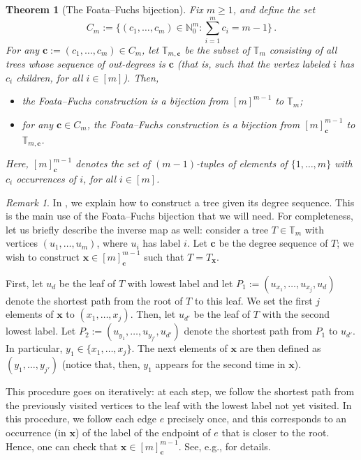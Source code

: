 \documentclass{article}
\newtheorem{theorem}{Theorem}[section]
\theoremstyle{remark}
\newtheorem{remark}{Remark}
\newcommand{\bN}{\mathbb{N}}
\newcommand{\bx}{\textbf{x}}
\newcommand{\bT}{\mathbb{T}}
\newcommand{\bc}{\mathbf{c}}
\begin{document}
\begin{theorem}[The Foata--Fuchs bijection]
\label{thm:foata fuchs}
Fix $m \geq 1$, and define the set 
\[
    C_m:= \Big\{ (c_1,\ldots,c_m) \in \bN_0^m : \sum_{i=1}^m c_i=m-1 \Big\} \,.
\] 
For any $\bc := (c_1,\ldots,c_m) \in C_m$, let $\bT_{m,\bc}$ be the subset of $\bT_m$ consisting of all trees whose sequence of out-degrees is $\bc$ (that is, such that the vertex labeled $i$ has $c_i$ children, for all $i \in [m]$). 
Then,
\begin{itemize}
    \item[(i)] the Foata--Fuchs construction is a bijection from $[m]^{m-1}$ to $\bT_m$;
    \item[(ii)] for any $\bc \in C_m$, the Foata--Fuchs construction is a bijection from $[m]^{m-1}_{\bc}$ to $\bT_{m,\bc}$.
\end{itemize}
Here, $[m]^{m-1}_{\bc}$ denotes the set of $(m\!-\!1)$-tuples of elements of $\{1,\ldots,m\}$ with $c_i$ occurrences of $i$, for all $i \in [m]$.
\end{theorem}

\begin{remark}
    In , we explain how to construct a tree given its degree sequence.
    This is the main use of the Foata--Fuchs bijection that we will need.
    For completeness, let us briefly describe the inverse map as well:
    consider a tree $T\in\bT_m$ with vertices $(u_1, \dots, u_m)$, where $u_i$ has label $i$.
    Let $\bc$ be the degree sequence of $T$; we wish to construct $\bx\in[m]^{m-1}_\bc$ such that $T = T_\bx$.
    
    First, let $u_d$ be the leaf of $T$ with lowest label and let $P_1 := (u_{x_1}, \dots, u_{x_j}, u_d)$ denote the shortest path from the root of $T$ to this leaf.
    We set the first $j$ elements of $\bx$ to $(x_1, \dots, x_j)$.
    Then, let $u_{d'}$ be the leaf of $T$ with the second lowest label.
    Let $P_2 := (u_{y_1}, \dots, u_{y_{j'}}, u_{d'})$ denote the shortest path from $P_1$ to $u_{d'}$.
    In particular, $y_1 \in \{x_1, \dots, x_j\}$.
    The next elements of $\bx$ are then defined as $(y_1, \dots, y_{j'})$ (notice that, then, $y_1$ appears for the second time in $\bx$).
    
    This procedure goes on iteratively: at each step, we follow the shortest path from the previously visited vertices to the leaf with the lowest label not yet visited.
    In this procedure, we follow each edge $e$ precisely once, and this corresponds to an occurrence (in $\bx$) of the label of the endpoint of $e$ that is closer to the root. 
    Hence, one can check that $\bx\in[m]^{m-1}_\bc$. See, e.g., \cite{Addario-Berry_Blanc-Renaudie_Donderwinkel_Maazoun_Martin_2023} for details.
\end{remark}
\end{document}
